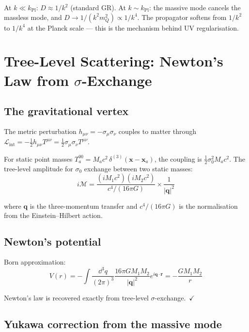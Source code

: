 \documentclass[11pt,a4paper]{article}
\theoremstyle{plain}
\theoremstyle{definition}
\theoremstyle{remark}
\newcommand{\mQ}{m_Q}
\begin{document}
At $k \ll k_{\mathrm{Pl}}$: $D \approx 1/k^2$ (standard GR).  At $k \sim k_{\mathrm{Pl}}$: the massive mode cancels the massless mode, and $D \to 1/(k^2 \mQ^2) \propto 1/k^4$.  The propagator softens from $1/k^2$ to $1/k^4$ at the Planck scale --- this is the mechanism behind UV regularisation.

\section{Tree-Level Scattering: Newton's Law from $\sigma$-Exchange}
\label{sec:scattering}

\subsection{The gravitational vertex}

The metric perturbation $h_{\mu\nu} = -\sigma_\mu\sigma_\nu$ couples to matter through $\mathcal{L}_{\mathrm{int}} = -\frac{1}{2}h_{\mu\nu}T^{\mu\nu} = \frac{1}{2}\sigma_\mu\sigma_\nu T^{\mu\nu}$.

For static point masses $T^{00}_a = M_ac^2\,\delta^{(3)}(\mathbf{x} - \mathbf{x}_a)$, the coupling is $\frac{1}{2}\sigma_0^2 M_ac^2$.  The tree-level amplitude for $\sigma_0$ exchange between two static masses:
\begin{equation}
  i\mathcal{M} = \frac{(iM_1c^2)(iM_2c^2)}{c^4/(16\pi G)}\times\frac{1}{|\mathbf{q}|^2}
\end{equation}

where $\mathbf{q}$ is the three-momentum transfer and $c^4/(16\pi G)$ is the normalisation from the Einstein--Hilbert action.

\subsection{Newton's potential}

Born approximation:
\begin{equation}
  V(r) = -\int\frac{\dd^3q}{(2\pi)^3}\frac{16\pi G M_1M_2}{|\mathbf{q}|^2}e^{i\mathbf{q}\cdot\mathbf{r}} = -\frac{GM_1M_2}{r}
\end{equation}

Newton's law is recovered exactly from tree-level $\sigma$-exchange.~$\checkmark$

\subsection{Yukawa correction from the massive mode}
\end{document}
